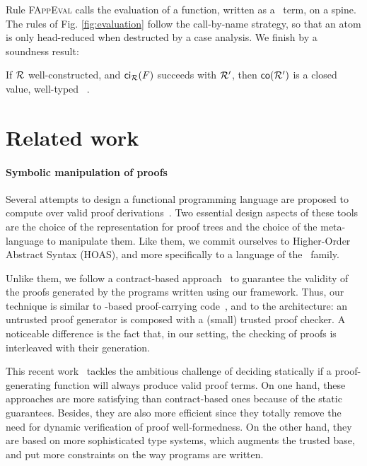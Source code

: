 \documentclass{llncs}
\begin{document}
Rule \textsc{FAppEval} calls the evaluation of a function, written as
a \CL\ term, on a spine. The rules of Fig. \ref{fig:evaluation} follow
the call-by-name strategy, so that an atom is only head-reduced when
destructed by a case analysis. We finish by a soundness result:

\begin{theorem}
  If $\mathcal{R}$ well-constructed, and ${\text{\textsf{ci$_{\mathcal{R}}$}}}({F})$ succeeds with $\mathcal{R'}$,
  then ${\text{\textsf{co}}}({\mathcal{R'}})$ is a closed value, well-typed \wrt\ \LF.
\end{theorem}

\section{Related work}

\paragraph{Symbolic manipulation of proofs}

Several attempts to design a functional programming language are
proposed to compute over valid proof
derivations~\cite{cave2012,stampoulis2012,poswolsky2008}. Two
essential design aspects of these tools are the choice of the
representation for proof trees and the choice of the meta-language to
manipulate them. Like them, we commit ourselves to Higher-Order
Abstract Syntax (HOAS), and more specifically to a language of the
\LF\ family.

Unlike them, we follow a contract-based approach~\cite{wadler2009well}
to guarantee the validity of the proofs generated by the programs
written using our framework. Thus, our technique is similar to
\LF-based proof-carrying code~\cite{necula1997proof,appel1999proof},
and to the  architecture: an untrusted proof generator is
composed with a (small) trusted proof checker. A noticeable difference
is the fact that, in our setting, the checking of proofs is
interleaved with their generation.

This recent work~\cite{cave2012,stampoulis2012,poswolsky2008} tackles
the ambitious challenge of deciding statically if a proof-generating
function will always produce valid proof terms. On one hand, these
approaches are more satisfying than contract-based ones because of the
static guarantees. Besides, they are also more efficient since they
totally remove the need for dynamic verification of proof
well-formedness. On the other hand, they are based on more sophisticated
type systems, which augments the trusted base, and put more
constraints on the way programs are written.
\end{document}
